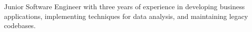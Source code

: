 
Junior Software Engineer with three years of experience in developing business applications, implementing techniques for data analysis, and maintaining legacy codebases. 

